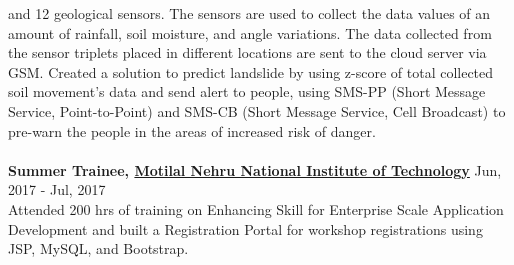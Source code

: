 \documentclass[margin, centered]{res}
\begin{document}
\begin{resume}
    and 12 geological sensors. The sensors are used to collect the data values of an amount of rainfall,
    soil moisture, and angle variations. The data collected from the sensor triplets placed in different
    locations are sent to the cloud server via GSM. Created a solution to predict landslide by using z-score
    of total collected soil movement’s data and send alert to people, using SMS-PP (Short Message Service,
    Point-to-Point) and SMS-CB (Short Message Service, Cell Broadcast) to pre-warn the people in the areas
    of increased risk of danger. \\
    \\
    \textbf{Summer Trainee, \href{http://www.mnnit.ac.in/}{Motilal Nehru National Institute of Technology}} \hfill Jun, 2017 - Jul, 2017 \\
    Attended 200 hrs of training on Enhancing Skill for Enterprise Scale Application Development and built a Registration
    Portal for workshop registrations using JSP, MySQL, and Bootstrap.



\end{resume}
\end{document}
